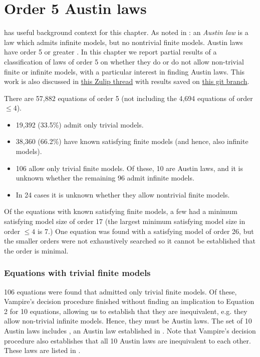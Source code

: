 \chapter{Order 5 Austin laws}\label{order-5-austin-laws}

 has useful background context for this chapter.
As noted in : an \emph{Austin law} is a law which admits infinite models, but no nontrivial finite models. Austin laws have order 5 or greater \cite{Kisielewicz2}.
In this chapter we report partial results of a classification of laws of order 5 on whether they do or do not allow non-trivial finite or infinite models, with a particular interest in finding Austin laws.
This work is also discussed in \href{https://leanprover.zulipchat.com/#narrow/channel/458659-Equational/topic/Some.20results.20from.20order.205/near/482118667}{this Zulip thread} with results saved on \href{https://github.com/vlad902/equational_theories/tree/order5}{this git branch}.

There are 57,882 equations of order 5 (not including the 4,694 equations of order $\le 4$).
\begin{itemize}
  \item 19,392 (33.5\%) admit only trivial models.
  \item 38,360 (66.2\%) have known satisfying finite models (and hence, also infinite models).
  \item 106 allow only trivial finite models. Of these, 10 are Austin laws, and it is unknown whether the remaining 96 admit infinite models.
  \item In 24 cases it is unknown whether they allow nontrivial finite models.
\end{itemize}

Of the equations with known satisfying finite models, a few had a minimum satisfying model size of order 17 (the largest minimum satisfying model size in order $\le 4$ is 7.) One equation was found with a satisfying model of order 26, but the smaller orders were not exhaustively searched so it cannot be established that the order is minimal.

\subsection*{Equations with trivial finite models}

106 equations were found that admitted only trivial finite models. Of these, Vampire's decision procedure finished without finding an implication to Equation 2 for 10 equations, allowing us to establish that they are inequivalent, e.g. they allow non-trivial infinite models.
Hence, they must be Austin laws.
The set of 10 Austin laws includes , an Austin law established in \cite{Kisielewicz2}.
Note that Vampire's decision procedure also establishes that all 10 Austin laws are inequivalent to each other.
These laws are listed in .

